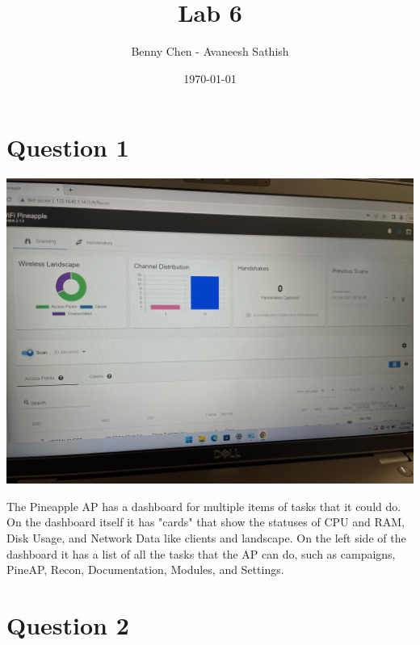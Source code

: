 \documentclass[12pt]{article}
\title{Lab 6}
\author{Benny Chen - Avaneesh Sathish}
\date{\today}
\begin{document}
\maketitle

\section*{Question 1}

\begin{center}
    \includegraphics[scale=.07]{images/q1.jpg}
\end{center}

The Pineapple AP has a dashboard for multiple items of tasks that it could do.
On the dashboard itself it has "cards" that show the statuses of
CPU and RAM, Disk Usage, and Network Data like clients and landscape.
On the left side of the dashboard it has a list of all the tasks that
the AP can do, such as campaigns, PineAP, Recon, Documentation, Modules, and Settings.

\section*{Question 2}
\end{document}
